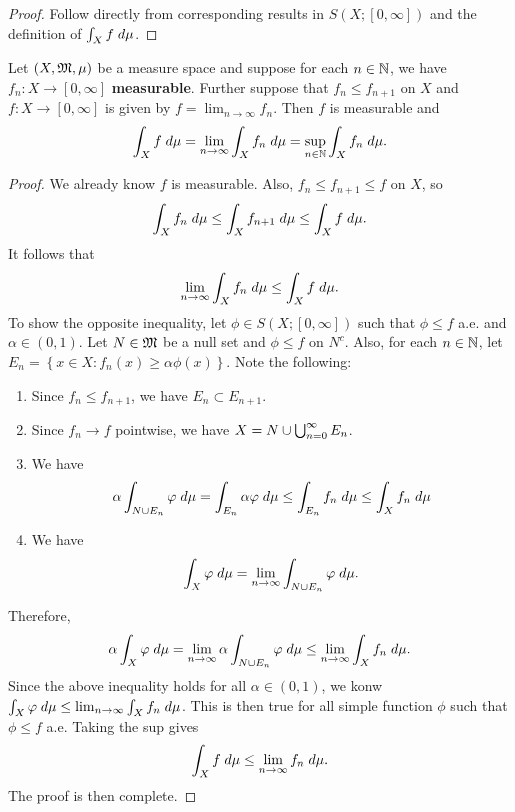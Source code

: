 \documentclass[a4paper]{article}
\begin{document}
\begin{proof}
Follow directly from corresponding results in $S(X; [0, \infty])$
and the definition of $\int_X f \; d \mu$.
\end{proof}

\begin{thm}
Let $(X, \mathfrak{M}, \mu)$ be a measure space and suppose for 
each $n \in \mathbb{N}$, we have $f_n : 
X \to [0, \infty]$ \textbf{measurable}. Further suppose 
that $f_n \leq f_{n+1}$ on $X$ and $f: X \to [0, \infty]$
is given by $f = \lim_{n \to \infty} f_n$. Then 
$f$ is measurable and 
\[
\int_X f \; d \mu = \lim_{n \to \infty} \int_X f_n \; d \mu
= \sup_{n \in \mathbb{N}} \int_X f_n \; d \mu.
\]
\end{thm}

\begin{proof}
We already know $f$ is measurable. Also, $f_n \leq f_{n+1}
\leq f$ on $X$, so 
\[
\int_X f_n \; d \mu \leq \int_X f_{n+1} \; d \mu \leq 
\int_X f \; d \mu.
\]
It follows that 
\[
\lim_{n \to \infty} \int_X f_n \; d \mu \leq \int_X f \; d \mu.
\]
To show the opposite inequality, let 
$\phi \in S(X; [0, \infty])$ such that $\phi \leq f$ a.e.
and $\alpha \in (0, 1)$. Let $N \in \mathfrak{M}$ be a null set 
and $\phi \leq f$ on $N^c$. Also, for each $n \in \mathbb{N}$, let 
$E_n = \left\{ x \in X : f_n(x) \geq \alpha \phi(x) \right\}$.
Note the following:
\begin{enumerate}
  \item Since $f_n \leq f_{n+1}$, we have $E_n \subset E_{n+1}$.
  \item Since $f_n \to f$ pointwise, we have $X = N \cup \bigcup_{n=0}^\infty
  E_n$.
  \item We have 
  \[
  \alpha \int_{N \cup E_n} \varphi \; d \mu 
  = \int_{E_n} \alpha \varphi \; d \mu 
  \leq \int_{E_n} f_n \; d \mu
  \leq \int_X f_n \; d \mu
  \]
  \item We have 
  \[
  \int_X \varphi \; d \mu
  = \lim_{n \to \infty} \int_{N \cup E_n} \varphi \; d \mu.
  \]
\end{enumerate}
Therefore, 
\[
\alpha \int_X \varphi \; d \mu 
= \lim_{n \to \infty} \alpha \int_{N \cup E_n} \varphi \; d \mu
\leq \lim_{n \to \infty} \int_X f_n \; d \mu.
\]
Since the above inequality holds for all $\alpha \in (0, 1)$,
we konw $\int_X \varphi \; d \mu \leq \lim_{n \to \infty} 
\int_X f_n \; d \mu$. This is then true for all simple function 
$\phi$ such that $\phi \leq f$ a.e. Taking the sup 
gives 
\[
\int_X f \; d \mu \leq \lim_{n \to \infty} f_n \; d \mu.
\]
The proof is then complete.
\end{proof}
\end{document}
